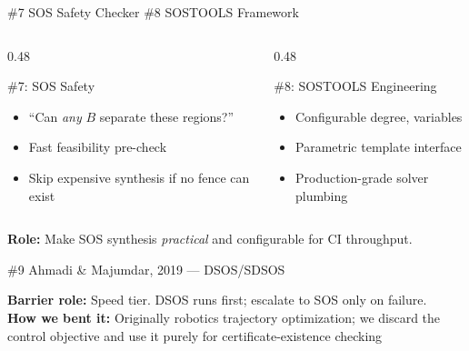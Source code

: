 \documentclass[aspectratio=169]{beamer}
\begin{document}
\begin{frame}{\#7 SOS Safety Checker \quad\quad \#8 SOSTOOLS Framework}
\begin{columns}[c]
\begin{column}{0.48\textwidth}
\begin{block}{\#7: SOS Safety}
\begin{itemize}
  \item ``Can \emph{any} $B$ separate these regions?''
  \item Fast feasibility pre-check
  \item Skip expensive synthesis if no fence can exist
\end{itemize}
\end{block}
\end{column}
\begin{column}{0.48\textwidth}
\begin{block}{\#8: SOSTOOLS Engineering}
\begin{itemize}
  \item Configurable degree, variables
  \item Parametric template interface
  \item Production-grade solver plumbing
\end{itemize}
\end{block}
\end{column}
\end{columns}

\vspace{0.8em}
\centering\textbf{Role:} Make SOS synthesis \emph{practical} and configurable for CI throughput.
\end{frame}


\begin{frame}{\#9 Ahmadi \& Majumdar, 2019 --- DSOS/SDSOS}

\vspace{0.8em}
\textbf{Barrier role:} Speed tier. DSOS runs first; escalate to SOS only on failure.\\[3pt]
\textbf{How we bent it:} Originally robotics trajectory optimization; we discard the control objective and use it purely for certificate-existence checking
\end{frame}
\end{document}

